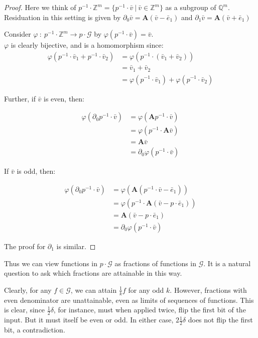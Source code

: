 \documentclass[12pt]{article}
\newcommand{\G}{\mathcal{G}}
\newcommand{\Z}{\mathbb{Z}}
\newcommand{\Q}{\mathbb{Q}}
\newcommand{\2}{\textbf{2}}
\newcommand{\Am}{\textbf{A}}
\newcommand{\del}{\partial}
\renewcommand{\v}{\bar{v}}
\newcommand{\e}{\bar{e}}
\begin{document}
\begin{proof}
  Here we think of $p^{-1} \cdot \Z^m = \{ p^{-1} \cdot \v~|~\v \in \Z^m \}$
  as a subgroup of $\Q^m$. Residuation in this setting is given by
  $\del_0 \v = \Am (\v - \e_1)$ and $\del_1 \v = \Am (\v + \e_1)$ 

  Consider $\varphi~:~p^{-1} \cdot \Z^m \to p \cdot \G$ by
  $\varphi(p^{-1} \cdot \v) = \v$.\\
  $\varphi$ is clearly bijective, and is a homomorphism since:
  \begin{align*}
       \varphi(p^{-1} \cdot \v_1 + p^{-1} \cdot \v_2) 
    &= \varphi(p^{-1} \cdot (\v_1 + \v_2))\\
    &= \v_1 + \v_2\\
    &= \varphi(p^{-1} \cdot \v_1) + \varphi(p^{-1} \cdot \v_2) 
  \end{align*}

  Further, if $\v$ is even, then:

  \begin{align*}
       \varphi(\del_0 p^{-1} \cdot \v)
    &= \varphi(\Am p^{-1} \cdot \v)\\
    &= \varphi(p^{-1} \cdot \Am \v)\\
    &= \Am \v\\
    &= \del_0 \varphi(p^{-1} \cdot \v)
  \end{align*}

  If $\v$ is odd, then: 

  \begin{align*}
       \varphi(\del_0 p^{-1} \cdot \v)
    &= \varphi(\Am (p^{-1} \cdot \v - \e_1))\\
    &= \varphi(p^{-1} \cdot \Am (\v - p \cdot \e_1))\\
    &= \Am (\v - p \cdot \e_1)\\
    &= \del_0 \varphi(p^{-1} \cdot \v)
  \end{align*}

  The proof for $\del_1$ is similar.
\end{proof}

Thus we can view functions in $p \cdot \G$ as fractions of functions in $\G$.
It is a natural question to ask which fractions are attainable in this way.

Clearly, for any $f \in \G$, we can attain $\frac{1}{k} f$ for any odd $k$.
However, fractions with even denominator are unattainable, 
even as limits of sequences of functions.
This is clear, since $\frac{1}{2}\delta$, for instance, must 
when applied twice, flip the first bit of the input. But it must itself
be even or odd. In either case, $2 \frac{1}{2} \delta$ does not flip the 
first bit, a contradiction.
\end{document}
